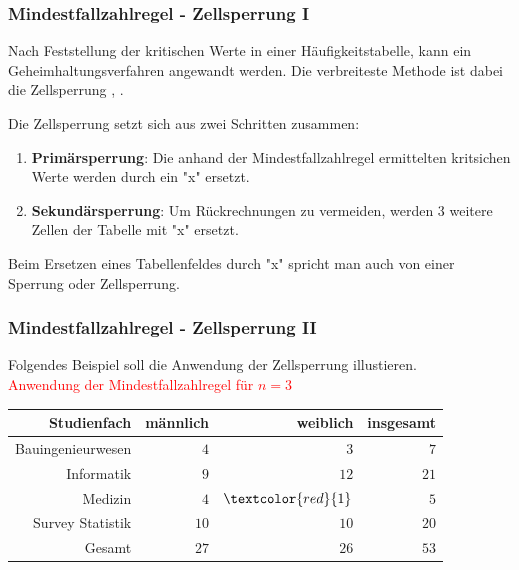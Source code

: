 \documentclass[aspectratio=169]{beamer}
\begin{document}
\begin{frame}
    \frametitle{Mindestfallzahlregel - Zellsperrung I}
    Nach Feststellung der kritischen Werte in einer Häufigkeitstabelle, kann ein Geheimhaltungsverfahren angewandt werden. Die verbreiteste Methode ist dabei die Zellsperrung \cite{Rothe-1}, \cite{Nickl}.
    \begin{theorem}[Zellsperrung]
        Die Zellsperrung setzt sich aus zwei Schritten zusammen:
        \begin{enumerate}
            \item \textbf{Primärsperrung}: Die anhand der Mindestfallzahlregel ermittelten kritsichen Werte werden durch ein "x" ersetzt.
            \item \textbf{Sekundärsperrung}: Um Rückrechnungen zu vermeiden, werden 3 weitere Zellen der Tabelle mit "x" ersetzt.
        \end{enumerate}
    \end{theorem}
    Beim Ersetzen eines Tabellenfeldes durch "x" spricht man auch von einer Sperrung oder Zellsperrung.
\end{frame}


\begin{frame}
    \frametitle{Mindestfallzahlregel - Zellsperrung II}
    Folgendes Beispiel soll die Anwendung der Zellsperrung illustieren. \\
    \textcolor{red}{Anwendung der Mindestfallzahlregel für $n = 3$}
    \begin{center}
        \begin{tabular}{ r r r r }
         \textbf{Studienfach} \vline & \textbf{männlich} & \textbf{weiblich} & \textbf{insgesamt} \\ 
         \hline
         Bauingenieurwesen \vline & $4$ & $3$ & $7$ \\
         Informatik \vline & $9$ & $12$ & $21$ \\  
         Medizin \vline & $4$ & $\textcolor{red}{1}$ & $5$ \\
         Survey Statistik \vline & $10$ & $10$ & $20$ \\
         \hline
         Gesamt \vline & $27$ & $26$ & $53$
        \end{tabular}
    \end{center}
\end{frame}
\end{document}
